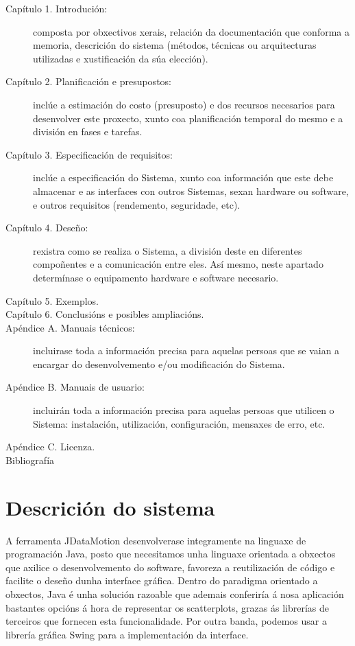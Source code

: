 \begin{description}
\item[Capítulo 1. Introdución:] composta por obxectivos xerais, relación da documentación que conforma a memoria, descrición do sistema (métodos, técnicas ou arquitecturas utilizadas e xustificación da súa elección).
\item[Capítulo 2. Planificación e presupostos:] inclúe a estimación do costo (presuposto) e dos recursos necesarios para desenvolver este proxecto, xunto coa planificación temporal do mesmo e a división en fases e tarefas.
\item[Capítulo 3. Especificación de requisitos:] inclúe a especificación do Sistema, xunto coa información que este debe almacenar e as interfaces con outros Sistemas, sexan hardware ou software, e outros requisitos (rendemento, seguridade, etc).
\item[Capítulo 4. Deseño:] rexistra como se realiza o Sistema, a división deste en diferentes compoñentes e a comunicación entre eles. Así mesmo, neste apartado determínase o equipamento hardware e software necesario.
\item[Capítulo 5. Exemplos.]
\item[Capítulo 6. Conclusións e posibles ampliacións.]
\item[Apéndice A. Manuais técnicos:] incluirase toda a información precisa para aquelas persoas que se vaian a encargar do desenvolvemento e/ou modificación do Sistema.
\item[Apéndice B. Manuais de usuario:] incluirán toda a información precisa para aquelas persoas que utilicen o Sistema: instalación, utilización, configuración, mensaxes de erro, etc.
\item[Apéndice C. Licenza.]
\item[Bibliografía]
\end{description} 

\section{Descrición do sistema}

A ferramenta JDataMotion desenvolverase integramente na linguaxe de programación Java, posto que necesitamos unha linguaxe orientada a obxectos que axilice o desenvolvemento do software, favoreza a reutilización de código e facilite o deseño dunha interface gráfica. Dentro do paradigma orientado a obxectos, Java é unha solución razoable que ademais conferiría á nosa aplicación bastantes opcións á hora de representar os scatterplots, grazas ás librerías de terceiros que fornecen esta funcionalidade. Por outra banda, podemos usar a librería gráfica Swing para a implementación da interface.
 
